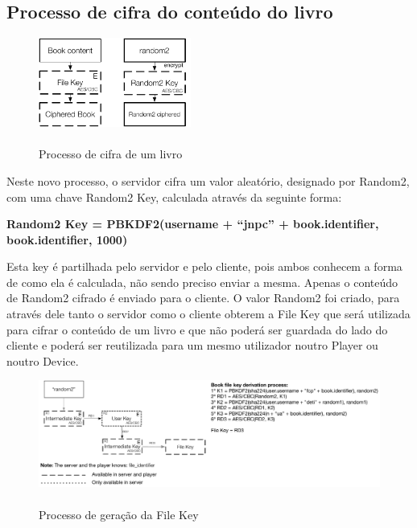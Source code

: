 \documentclass[pdftex,12pt,a4paper]{report}
\begin{document}
\subsection{Processo de cifra do conteúdo do livro}

\begin{figure}[!htb]
\center
 \includegraphics[width=50mm,scale=1]{book-cipher-process.pdf}
 \caption{\\Processo de cifra de um livro}\label{fig:eer}
\end{figure}

Neste novo processo, o servidor cifra um valor aleatório, designado por Random2, com uma chave Random2 Key, calculada através da seguinte forma:

\begin{center}
	\textbf{Random2 Key = PBKDF2(username + “jnpc” + book.identifier, book.identifier, 1000)}
\end{center}

	Esta key é partilhada pelo servidor e pelo cliente, pois ambos conhecem a forma de como ela é calculada, não sendo preciso enviar a mesma. Apenas o conteúdo de Random2 cifrado é enviado para o cliente. 
	O valor Random2 foi criado, para através dele tanto o servidor como o cliente obterem a File Key que será utilizada para cifrar o conteúdo de um livro e que não poderá ser guardada do lado do cliente e poderá ser reutilizada para um mesmo utilizador noutro Player ou noutro Device.

\begin{figure}[!htb]
\center
 \includegraphics[width=150mm,scale=1]{file-key-generation.pdf}
 \caption{\\Processo de geração da File Key}\label{fig:eer}
\end{figure}
\end{document}
